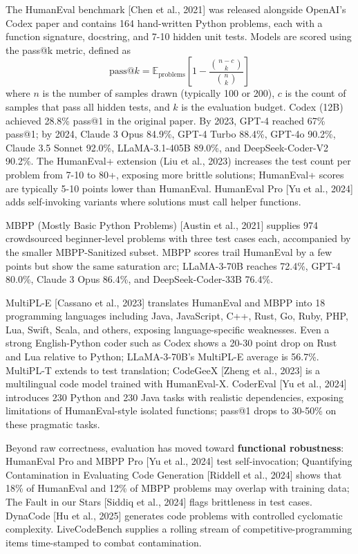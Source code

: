 The HumanEval benchmark {[}Chen et al., 2021{]} was released alongside OpenAI's Codex paper and contains 164 hand-written Python problems, each with a function signature, docstring, and 7-10 hidden unit tests. Models are scored using the pass@k metric, defined as
\[\text{pass@}k = \mathbb{E}_{\text{problems}}\left[1 - \frac{\binom{n - c}{k}}{\binom{n}{k}}\right]\]
where \(n\) is the number of samples drawn (typically 100 or 200), \(c\) is the count of samples that pass all hidden tests, and \(k\) is the evaluation budget. Codex (12B) achieved 28.8\% pass@1 in the original paper. By 2023, GPT-4 reached 67\% pass@1; by 2024, Claude 3 Opus 84.9\%, GPT-4 Turbo 88.4\%, GPT-4o 90.2\%, Claude 3.5 Sonnet 92.0\%, LLaMA-3.1-405B 89.0\%, and DeepSeek-Coder-V2 90.2\%. The HumanEval+ extension (Liu et al., 2023) increases the test count per problem from 7-10 to 80+, exposing more brittle solutions; HumanEval+ scores are typically 5-10 points lower than HumanEval. HumanEval Pro {[}Yu et al., 2024{]} adds self-invoking variants where solutions must call helper functions.

MBPP (Mostly Basic Python Problems) {[}Austin et al., 2021{]} supplies 974 crowdsourced beginner-level problems with three test cases each, accompanied by the smaller MBPP-Sanitized subset. MBPP scores trail HumanEval by a few points but show the same saturation arc; LLaMA-3-70B reaches 72.4\%, GPT-4 80.0\%, Claude 3 Opus 86.4\%, and DeepSeek-Coder-33B 76.4\%.

MultiPL-E {[}Cassano et al., 2023{]} translates HumanEval and MBPP into 18 programming languages including Java, JavaScript, C++, Rust, Go, Ruby, PHP, Lua, Swift, Scala, and others, exposing language-specific weaknesses. Even a strong English-Python coder such as Codex shows a 20-30 point drop on Rust and Lua relative to Python; LLaMA-3-70B's MultiPL-E average is 56.7\%. MultiPL-T extends to test translation; CodeGeeX {[}Zheng et al., 2023{]} is a multilingual code model trained with HumanEval-X. CoderEval {[}Yu et al., 2024{]} introduces 230 Python and 230 Java tasks with realistic dependencies, exposing limitations of HumanEval-style isolated functions; pass@1 drops to 30-50\% on these pragmatic tasks.

Beyond raw correctness, evaluation has moved toward \textbf{functional robustness}: HumanEval Pro and MBPP Pro {[}Yu et al., 2024{]} test self-invocation; Quantifying Contamination in Evaluating Code Generation {[}Riddell et al., 2024{]} shows that 18\% of HumanEval and 12\% of MBPP problems may overlap with training data; The Fault in our Stars {[}Siddiq et al., 2024{]} flags brittleness in test cases. DynaCode {[}Hu et al., 2025{]} generates code problems with controlled cyclomatic complexity. LiveCodeBench supplies a rolling stream of competitive-programming items time-stamped to combat contamination.


